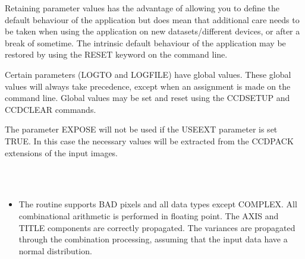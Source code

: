 \documentclass[twoside,11pt]{article}
\newcommand{\htmlref}[2]{#1}
\renewcommand{\_}{\texttt{\symbol{95}}}
\newcommand{\xroutine}[1]{\htmlref{{\sc #1}}{#1}}
\newcommand{\sstimplementationstatus}[1]{
   \item[{Implementation Status:}] \mbox{} \\[1.3ex] #1}
\newcommand{\sstitemlist}[1]{
  \mbox{} \\
  \vspace{-3.5ex}
  \begin{itemize}
     #1
  \end{itemize}
}
\newcommand{\sstitem}{\item}
\newcommand{\sstimplementationstatus}[1]{
      \item[Implementation Status:] #1
   }
\newcommand{\sstitemlist}[1]{
      \begin{itemize}
         #1
      \end{itemize}
      \\
   }
\newcommand{\sstitem}{\item}
\begin{document}
{{{      }
      Retaining parameter values has the advantage of allowing you to
      define the default behaviour of the application but does mean
      that additional care needs to be taken when using the application
      on new datasets/different devices, or after a break of sometime.
      The intrinsic default behaviour of the application may be
      restored by using the RESET keyword on the command line.

      Certain parameters (LOGTO and LOGFILE) have global values. These
      global values will always take precedence, except when an
      assignment is made on the command line.  Global values may be set
      and reset using the \xroutine{CCDSETUP} and \xroutine{CCDCLEAR} commands.

      The parameter EXPOSE will not be used if the USEEXT parameter is
      set TRUE. In this case the necessary values will be extracted from
      the CCDPACK extensions of the input images.
   }
   \sstimplementationstatus{
      \sstitemlist{

         \sstitem
         The routine supports BAD pixels and all data types except
           COMPLEX. All combinational arithmetic is performed in floating
           point. The AXIS and TITLE components are correctly
           propagated. The variances are propagated through the combination
           processing, assuming that the input data have a normal
           distribution.
      }
   }
}
\end{document}
